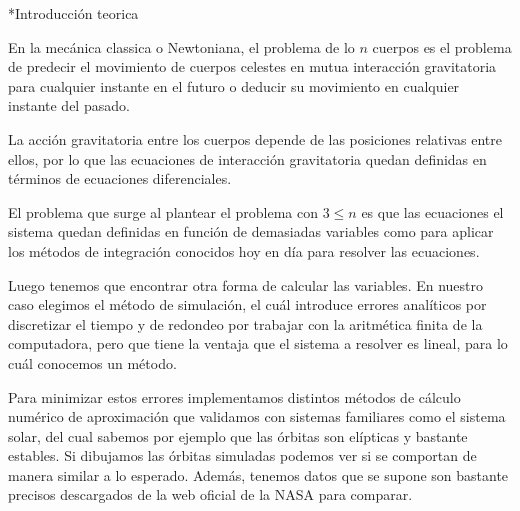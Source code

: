 \documentclass[12pt,titlepage]{article}
\newenvironment{usection}[1]{\newpage\begin{section}*{#1}	\addcontentsline{toc}{section}{#1}}{\end{section}}
\begin{document}



\begin{titlepage}
\maketitle
\end{titlepage}
\tableofcontents
\newpage

	\begin{usection}{Introducción teorica}

		En la mecánica classica o Newtoniana, el problema de lo $n$
		cuerpos es el problema de predecir el movimiento de cuerpos
		celestes en mutua interacción gravitatoria para cualquier
		instante en el futuro o deducir su movimiento en cualquier
		instante del pasado.

		La acción gravitatoria entre los cuerpos depende de las
		posiciones relativas entre ellos, por lo que las ecuaciones de
		interacción gravitatoria quedan definidas en términos de
		ecuaciones diferenciales.

		El problema que surge al plantear el problema con $3 \leq n$ es
		que las ecuaciones el sistema quedan definidas en función de
		demasiadas variables como para aplicar los métodos de integración
		conocidos hoy en día para resolver las ecuaciones.

		Luego tenemos que encontrar otra forma de calcular las
		variables. En nuestro caso elegimos el método de simulación,
		el cuál introduce errores analíticos por discretizar el tiempo y
		de redondeo por trabajar con la aritmética finita de la
		computadora, pero que tiene la ventaja que el sistema a resolver
		es lineal, para lo cuál conocemos un método.

		Para minimizar estos errores implementamos distintos métodos de
		cálculo numérico de aproximación que validamos con sistemas
		familiares como el sistema solar, del cual sabemos por ejemplo
		que las órbitas son elípticas y bastante estables. Si dibujamos
		las órbitas simuladas podemos ver si se comportan de manera
		similar a lo esperado. Además, tenemos datos que se supone son
		bastante precisos descargados de la web oficial de la NASA para
		comparar.

	\end{usection}
\end{document}
